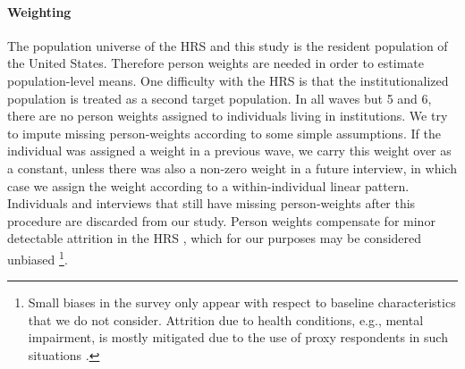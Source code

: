 \documentclass[11pt,oneside]{article} %
\begin{document}
\paragraph*{Weighting}
The population universe of the HRS and this study is the resident
population of the United States. Therefore person weights are needed in
order to estimate population-level means. 
One difficulty with the HRS is that the institutionalized population is treated
as a second target population. In all waves but 5 and 6, there are no person weights
assigned to individuals living in institutions. We try to impute missing
person-weights according to some simple assumptions. If the individual was
assigned a weight in a previous wave, we carry this weight over as a constant, unless there was also a non-zero weight in a future interview, in
which case we assign the weight according to a within-individual linear
pattern. Individuals and interviews that still have missing person-weights
after this procedure are discarded from our study. Person weights compensate for
minor detectable attrition in the HRS \citep{kapteyn2006effects}, which for
our purposes may be considered unbiased \footnote{Small biases in the survey
only appear with respect to baseline characteristics that we do not consider.
Attrition due to health conditions, e.g., mental impairment, is mostly mitigated
due to the use of proxy respondents in such situations \citep{weir2011proxy}.}.
\end{document}
